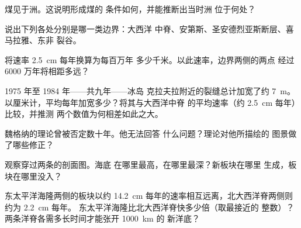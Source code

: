 \begin{exercise}[$\star\star$]\label{exo:g7:plate-tectonics:5}
煤见于洲。这说明形成煤的
条件如何，并能推断出当时洲
位于何处？
\end{exercise}

\begin{exercise}[$\star\star$]\label{exo:g7:plate-tectonics:6}
说出下列各处分别是哪一类边界：大西洋
中脊、安第斯、圣安德烈亚斯断层、喜马拉雅、东非
裂谷。
\end{exercise}

\begin{exercise}[$\star\star$]\label{exo:g7:plate-tectonics:7}
将速率 \qty{2.5}{cm} 每年换算为每百万年
多少千米。以此速率，边界两侧的两点
经过 6000 万年将相距多远？
\end{exercise}

\begin{exercise}[$\star\star$]\label{exo:g7:plate-tectonics:8}
1975 年至 1984 年——共九年——冰岛
克拉夫拉附近的裂缝总计加宽了约 \qty{7}{m}。
以厘米计，平均每年加宽多少？将其与大西洋中脊
的平均速率（约 \qty{2.5}{cm} 每年）比较，并推测
两个数值为何相差如此之大。
\end{exercise}

\begin{exercise}[$\star\star$]\label{exo:g7:plate-tectonics:9}
魏格纳的理论曾被否定数十年。他无法回答
什么问题？理论对他所描绘的
图景做了哪些修正？
\end{exercise}

\begin{exercise}[$\star\star$]\label{exo:g7:plate-tectonics:10}
观察穿过两条的剖面图。海底
在哪里最高，在哪里最深？新板块在哪里
生成，板块在哪里没入？
\end{exercise}

\begin{exercise}[$\star\star\star$]\label{exo:g7:plate-tectonics:11}
东太平洋海隆两侧的板块以约 \qty{14.2}{cm}
每年的速率相互远离，北大西洋脊两侧则约为 \qty{2.2}{cm} 每年。
东太平洋海隆比北大西洋脊快多少倍（取最接近的
整数）？两条洋脊各需多长时间才能张开 \qty{1000}{km} 的
新洋底？
\end{exercise}

